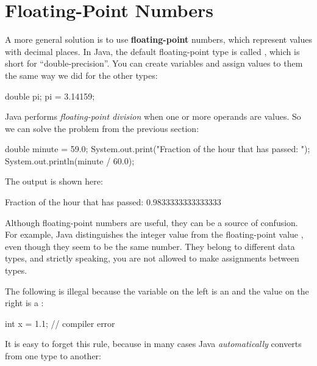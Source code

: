 \section{Floating-Point Numbers}


A more general solution is to use {\bf floating-point} numbers, which represent values with decimal places.
In Java, the default floating-point type is called , which is short for ``double-precision''.
You can create  variables and assign values to them the same way we did for the other types:

\begin{code}
double pi;
pi = 3.14159;
\end{code}


Java performs {\em floating-point division} when one or more operands are  values.
So we can solve the problem from the previous section:

\begin{code}
double minute = 59.0;
System.out.print("Fraction of the hour that has passed: ");
System.out.println(minute / 60.0);
\end{code}

The output is shown here:

\begin{stdout}
Fraction of the hour that has passed: 0.9833333333333333
\end{stdout}

Although floating-point numbers are useful, they can be a source of confusion.
For example, Java distinguishes the integer value  from the floating-point value , even though they seem to be the same number.
They belong to different data types, and strictly speaking, you are not allowed to make assignments between types.

The following is illegal because the variable on the left is an  and the value on the right is a :

\begin{code}
int x = 1.1;  // compiler error
\end{code}


It is easy to forget this rule, because in many cases Java {\em automatically} converts from one type to another:

